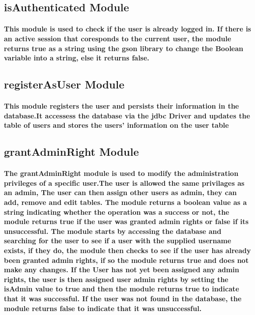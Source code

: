 \documentclass[11pt,a4paper]{article}
\begin{document}
\subsection{isAuthenticated Module}
\paragraph{This module is used to check if the user is already logged in. If there is an active session that coresponds to the current user, the module returns true as a string using the gson library to change the Boolean variable into a string, else it returns false.}

\subsection{registerAsUser Module}
\paragraph{This module registers the user and persists their information in the database.It accessess the database via the jdbc Driver and updates the table of users and stores the users' information on the user table}

\subsection{grantAdminRight Module}
\paragraph{The grantAdminRight module is used to modify the administration privileges of a specific user.The user is allowed the same privilages as an admin, The user can then assign other users as admin, they can add, remove and edit tables. The module returns a boolean value as a string indicating whether the operation was a success or not, the module returns true if the user was granted admin rights or false if its unsuccessful. The module starts by accessing the database and searching for the user to see if a user with the supplied username exists, if they do, the module then checks to see if the user has already been granted admin rights, if so the module returns true and does not make any changes. If the User has not yet been assigned any admin rights, the user is then assigned user admin rights by setting the isAdmin value to true and then the module returns true to indicate that it was successful. If the user was not found in the database, the module returns false to indicate that it was unsuccessful.}
\end{document}
